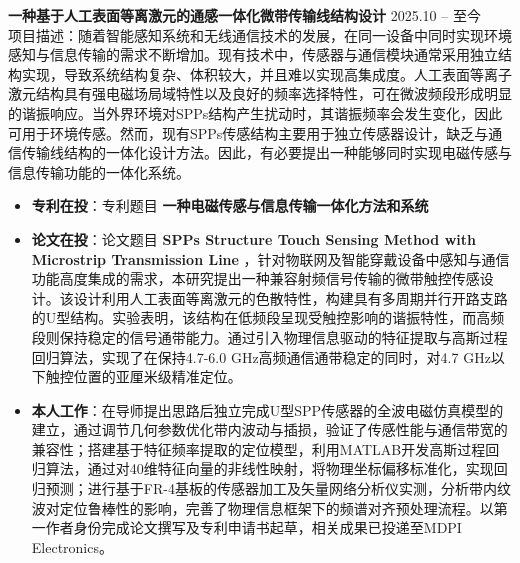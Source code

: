 \documentclass[11pt]{article}
\newlength{\interProjectSpacing}
\newcommand{\projectsep}{\vspace{\interProjectSpacing}}
\newlength{\intraProjectTitleSep}
\newcommand{\titlebreak}{\\[\intraProjectTitleSep]}
\newlength{\intraProjectListTopSep}
\begin{document}
\textbf{一种基于人工表面等离激元的通感一体化微带传输线结构设计} \hfill 2025.10 -- 至今 \titlebreak
项目描述：随着智能感知系统和无线通信技术的发展，在同一设备中同时实现环境感知与信息传输的需求不断增加。现有技术中，传感器与通信模块通常采用独立结构实现，导致系统结构复杂、体积较大，并且难以实现高集成度。人工表面等离子激元结构具有强电磁场局域特性以及良好的频率选择特性，可在微波频段形成明显的谐振响应。当外界环境对SPPs结构产生扰动时，其谐振频率会发生变化，因此可用于环境传感。然而，现有SPPs传感结构主要用于独立传感器设计，缺乏与通信传输线结构的一体化设计方法。因此，有必要提出一种能够同时实现电磁传感与信息传输功能的一体化系统。
\begin{itemize}[nosep, topsep=\intraProjectListTopSep]
    \item \textbf{专利在投}：专利题目 \textbf{一种电磁传感与信息传输一体化方法和系统} 
    \item \textbf{论文在投}：论文题目 \textbf{SPPs Structure Touch Sensing Method with Microstrip Transmission Line} ，针对物联网及智能穿戴设备中感知与通信功能高度集成的需求，本研究提出一种兼容射频信号传输的微带触控传感设计。该设计利用人工表面等离激元的色散特性，构建具有多周期并行开路支路的U型结构。实验表明，该结构在低频段呈现受触控影响的谐振特性，而高频段则保持稳定的信号通带能力。通过引入物理信息驱动的特征提取与高斯过程回归算法，实现了在保持4.7-6.0 GHz高频通信通带稳定的同时，对4.7 GHz以下触控位置的亚厘米级精准定位。
    \item \textbf{本人工作}：在导师提出思路后独立完成U型SPP传感器的全波电磁仿真模型的建立，通过调节几何参数优化带内波动与插损，验证了传感性能与通信带宽的兼容性；搭建基于特征频率提取的定位模型，利用MATLAB开发高斯过程回归算法，通过对40维特征向量的非线性映射，将物理坐标偏移标准化，实现回归预测；进行基于FR-4基板的传感器加工及矢量网络分析仪实测，分析带内纹波对定位鲁棒性的影响，完善了物理信息框架下的频谱对齐预处理流程。以第一作者身份完成论文撰写及专利申请书起草，相关成果已投递至MDPI Electronics。
\end{itemize}

\projectsep
\end{document}
